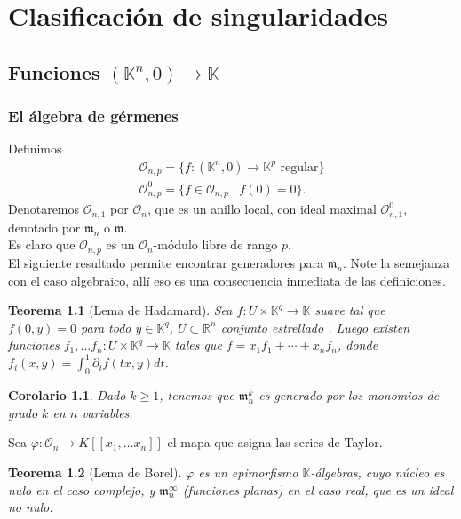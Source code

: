 \documentclass[12pt]{book}
\newtheorem{teo}{Teorema}
\newtheorem{cor}{Corolario}
\newcommand{\oo}{\mathcal{O}_n}
\begin{document}
\part{Clasificación de singularidades}

\chapter{Funciones $(\mathbb{K}^n, 0) \rightarrow \mathbb{K}$}

\section{El álgebra de gérmenes}

Definimos \begin{eqnarray*}
\mathcal{O} _{n,p} =\{ f:(\mathbb{K}^n,0) \rightarrow \mathbb{K}^p \mbox{ regular}\}\\
\mathcal{O}_{n,p}^{0} = \{f\in \mathcal{O}_{n,p} \;|\; f(0)=0\}.
\end{eqnarray*}
Denotaremos $\mathcal{O}_{n,1}$ por $\mathcal{O}_n$, que es un anillo local, con ideal maximal $ \mathcal{O}_{n,1}^0$, denotado por $\mathfrak{m}_n$ o $\mathfrak{m}$.\\ 
Es claro que $\mathcal{O}_{n,p}$ es un $\oo$-módulo libre de rango $p$.\\


El siguiente resultado permite encontrar generadores para $\mathfrak{m}_n$. Note la semejanza con el caso algebraico, allí eso es una consecuencia inmediata de las definiciones.

\begin{teo}[Lema de Hadamard]
Sea $f: U \times \mathbb{K}^q \rightarrow \mathbb{K}$ suave tal que $f(0,y) =0$ para todo $y\in \mathbb{K}^q$, $U\subset\mathbb{R}^n$ conjunto estrellado . Luego existen funciones $f_1, \ldots f_n: U \times \mathbb{K}^q \rightarrow \mathbb{K}$ tales que $f= x_1 f_1 + \cdots + x_n f_n$, donde $f_i (x,y) =  \int^1 _0 \partial_i f (tx, y) dt  $.
\end{teo}%
\begin{cor}	
Dado $k\geq 1$, tenemos que $\mathfrak{m}_n ^k $ es generado por los monomios de grado $k$ en $n$ variables. 
\end{cor}




Sea $\varphi : \mathcal{O}_n \rightarrow K[[x_1, \ldots x_n]]$ el mapa que asigna las series de Taylor. 
\begin{teo}[Lema de Borel]
	$\varphi$ es un epimorfismo $\mathbb{K}$-álgebras, cuyo núcleo es nulo en el caso complejo, y $\mathfrak{m}_n^\infty$ (funciones planas) en el caso real, que es un ideal no nulo. 
\end{teo}
\end{document}
